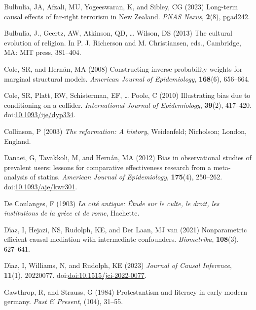 \documentclass[
  single column]{article}
\newlength{\cslhangindent}
\newenvironment{CSLReferences}[2] %
 {\begin{list}{}{%
  \setlength{\itemindent}{0pt}
  \setlength{\leftmargin}{0pt}
  \setlength{\parsep}{0pt}
  \ifodd #1
   \setlength{\leftmargin}{\cslhangindent}
   \setlength{\itemindent}{-1\cslhangindent}
  \fi
  \setlength{\itemsep}{#2\baselineskip}}}
 {\end{list}}
\begin{document}
\begin{CSLReferences}{1}{0}
Bulbulia, JA, Afzali, MU, Yogeeswaran, K, and Sibley, CG (2023)
Long-term causal effects of far-right terrorism in {N}ew {Z}ealand.
\emph{PNAS Nexus}, \textbf{2}(8), pgad242.

Bulbulia, J., Geertz, AW, Atkinson, QD, \ldots{} Wilson, DS (2013) The
cultural evolution of religion. In P. J. Richerson and M. Christiansen,
eds., Cambridge, MA: MIT press, 381--404.

Cole, SR, and Hernán, MA (2008) Constructing inverse probability weights
for marginal structural models. \emph{American Journal of Epidemiology},
\textbf{168}(6), 656--664.

Cole, SR, Platt, RW, Schisterman, EF, \ldots{} Poole, C (2010)
Illustrating bias due to conditioning on a collider. \emph{International
Journal of Epidemiology}, \textbf{39}(2), 417--420.
doi:\href{https://doi.org/10.1093/ije/dyp334}{10.1093/ije/dyp334}.

Collinson, P (2003) \emph{The reformation: A history}, Weidenfeld;
Nicholson; London, England.

Danaei, G, Tavakkoli, M, and Hernán, MA (2012) Bias in observational
studies of prevalent users: lessons for comparative effectiveness
research from a meta-analysis of statins. \emph{American Journal of
Epidemiology}, \textbf{175}(4), 250--262.
doi:\href{https://doi.org/10.1093/aje/kwr301}{10.1093/aje/kwr301}.

De Coulanges, F (1903) \emph{La cité antique: Étude sur le culte, le
droit, les institutions de la grèce et de rome}, Hachette.

Dı́az, I, Hejazi, NS, Rudolph, KE, and Der Laan, MJ van (2021)
Nonparametric efficient causal mediation with intermediate confounders.
\emph{Biometrika}, \textbf{108}(3), 627--641.

Dı́az, I, Williams, N, and Rudolph, KE (2023) \emph{Journal of Causal
Inference}, \textbf{11}(1), 20220077.
doi:\href{https://doi.org/doi:10.1515/jci-2022-0077}{doi:10.1515/jci-2022-0077}.

Gawthrop, R, and Strauss, G (1984) Protestantism and literacy in early
modern germany. \emph{Past \& Present}, (104), 31--55.


\end{CSLReferences}
\end{document}
